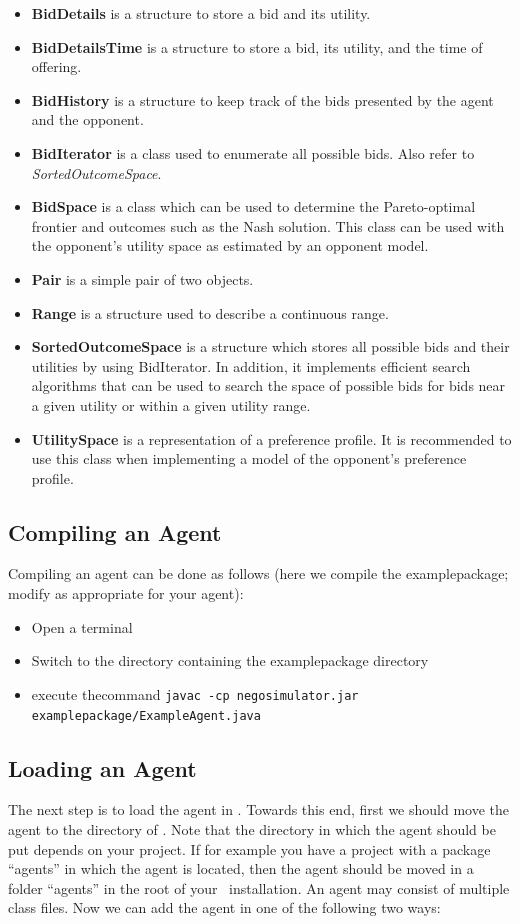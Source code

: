 \documentclass[]{article}
\begin{document}
\begin{itemize}

\item \textbf{BidDetails} is a structure to store a bid and its utility.
\item \textbf{BidDetailsTime} is a structure to store a bid, its utility, and the time of offering.
\item \textbf{BidHistory} is a structure to keep track of the bids presented by the agent and the opponent.
\item \textbf{BidIterator} is a class used to enumerate all possible bids. Also refer to \textit{SortedOutcomeSpace}.
\item \textbf{BidSpace} is a class which can be used to determine the Pareto-optimal frontier and outcomes such as the Nash solution. This class can be used with the opponent's utility space as estimated by an opponent model.
\item \textbf{Pair} is a simple pair of two objects.
\item \textbf{Range} is a structure used to describe a continuous range.
\item \textbf{SortedOutcomeSpace} is a structure which stores all possible bids and their utilities by using BidIterator. In addition, it implements efficient search algorithms that can be used to search the space of possible bids for bids near a given utility or within a given utility range.
\item \textbf{UtilitySpace} is a representation of a preference profile. It is recommended to use this class when implementing a model of the opponent's preference profile.
\end{itemize}

\subsection{Compiling an Agent}
Compiling an agent can be done as follows (here we compile the examplepackage; modify as appropriate for your agent):
\begin{itemize}
\item Open a terminal
\item Switch to the directory containing the examplepackage directory
\item execute thecommand \texttt{javac -cp negosimulator.jar examplepackage/ExampleAgent.java}
\end{itemize}

\subsection{Loading an Agent}
The next step is to load the agent in \Genius. Towards this end, first we should move the agent to the directory of \Genius. Note that the directory in which the agent should be put depends on your project. If for example you have a project with a package ``agents'' in which the agent is located, then the agent should be moved in a folder ``agents'' in the root of your \Genius~installation. An agent may consist of multiple class files. Now we can add the agent in one of the following two ways:
\end{document}
